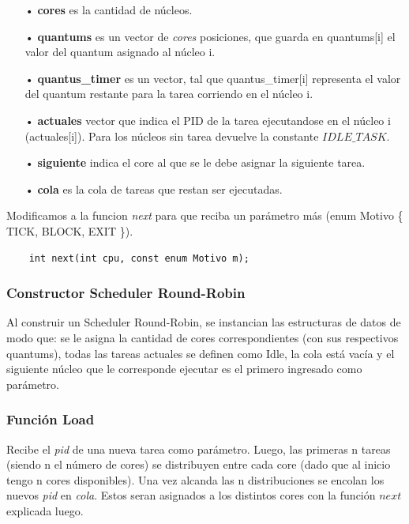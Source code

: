 \documentclass[a4paper]{article}
\begin{document}
	\begin{itemize}
	\item[•]\textbf{cores} es la cantidad de n\'ucleos.
	\item[•]\textbf{quantums} es un vector de \textit{cores} posiciones, que guarda en quantums[i] el valor del quantum asignado al n\'ucleo i.
	\item[•]\textbf{quantus_timer} es un vector, tal que quantus_timer[i] representa el valor del quantum restante para la tarea corriendo en el n\'ucleo i.
	\item[•]\textbf{actuales} vector que indica el PID de la tarea ejecutandose en el núcleo i (actuales[i]). Para los núcleos sin tarea devuelve la constante $IDLE\_TASK$.
	\item[•]\textbf{siguiente} indica el core al que se le debe asignar la siguiente tarea.
	\item[•]\textbf{cola} es la cola de tareas que restan ser ejecutadas.
	\end{itemize}	
	
\noindent  Modificamos a la funcion \emph{next} para que reciba un par\'ametro m\'as (enum Motivo \{ TICK, BLOCK, EXIT \}).
	\begin{codesnippet}
	\begin{verbatim}
    int next(int cpu, const enum Motivo m);
	\end{verbatim}
	\end{codesnippet}
		
\subsubsection*{Constructor Scheduler Round-Robin}		

Al construir un Scheduler Round-Robin, se instancian las estructuras de datos de modo que: se le asigna la cantidad de cores correspondientes (con sus respectivos quantums), todas las tareas actuales se definen como Idle, la cola est\'a vac\'ia y el siguiente n\'ucleo que le corresponde ejecutar es el primero ingresado como par\'ametro.

\subsubsection*{Funci\'on Load}

Recibe el \emph{pid} de una nueva tarea como par\'ametro. Luego, las primeras n tareas (siendo n el número de cores) se distribuyen entre cada core (dado que al inicio tengo n cores disponibles). Una vez alcanda las n distribuciones se encolan los nuevos \emph{pid} en \emph{cola}. Estos seran asignados a los distintos cores con la función $next$ explicada luego.
\end{document}
